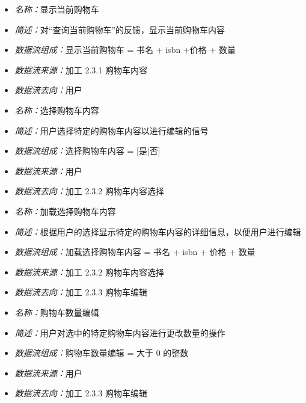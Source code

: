 \vspace{-1mm}

\begin{itemize}
	\item \textit{名称：}显示当前购物车
	\item \textit{简述：}对“查询当前购物车”的反馈，显示当前购物车内容
	\item \textit{数据流组成：}显示当前购物车 = 书名 + isbn +价格 + 数量
	\item \textit{数据流来源：}加工 2.3.1 购物车内容
	\item \textit{数据流去向：}用户
\end{itemize}

\vspace{-1mm}

\begin{itemize}
	\item \textit{名称：}选择购物车内容
	\item \textit{简述：}用户选择特定的购物车内容以进行编辑的信号
	\item \textit{数据流组成：}选择购物车内容 = [是|否]
	\item \textit{数据流来源：}用户
	\item \textit{数据流去向：}加工 2.3.2 购物车内容选择
\end{itemize}

\vspace{-1mm}

\begin{itemize}
	\item \textit{名称：}加载选择购物车内容
	\item \textit{简述：}根据用户的选择显示特定的购物车内容的详细信息，以便用户进行编辑
	\item \textit{数据流组成：}加载选择购物车内容 = 书名 + isbn + 价格 + 数量
	\item \textit{数据流来源：}加工 2.3.2 购物车内容选择
	\item \textit{数据流去向：}加工 2.3.3 购物车编辑
\end{itemize}

\vspace{-1mm}

\begin{itemize}
	\item \textit{名称：}购物车数量编辑
	\item \textit{简述：}用户对选中的特定购物车内容进行更改数量的操作
	\item \textit{数据流组成：}购物车数量编辑 = 大于 0 的整数
	\item \textit{数据流来源：}用户
	\item \textit{数据流去向：}加工 2.3.3 购物车编辑
\end{itemize}

